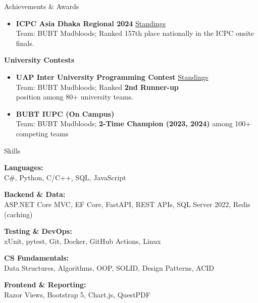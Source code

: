 \documentclass{resume}
\begin{document}
\begin{minipage}[t]{0.46\textwidth}
\begin{rSection}{Achievements \& Awards}
{\begin{itemize}[leftmargin=1.5em, itemsep=2pt, parsep=0pt, topsep=2pt]
    \item \textbf{ICPC Asia Dhaka Regional 2024} \hfill \href{https://bapsoj.org/contests/icpc-asia-dhaka-regional-contest-2024-onsite-round/standings}{Standings} \\
   Team: BUBT Mudbloods; Ranked 157th place nationally in the ICPC onsite finals.
\end{itemize}

\vspace{6pt}
{\bf University Contests}
\begin{itemize}[leftmargin=1.5em, itemsep=2pt, parsep=0pt, topsep=2pt]
    \item \textbf{UAP Inter University Programming Contest} \hfill \href{https://toph.co/c/uap-inter-university-collaborative-1-0-junior/standings}{Standings} \\
    Team: BUBT Mudbloods; Ranked \textbf{2nd Runner-up} \\ 
    position among 80+ university teams.

    \item \textbf{BUBT IUPC (On Campus)} \\
    Team: BUBT Mudbloods; \textbf{2-Time Champion (2023, 2024)} among 100+ competing teams
\end{itemize}
}
\end{rSection}


\begin{rSection}{Skills}

\textbf{Languages:}\\
C\#, Python, C/C++, SQL, JavaScript

\vspace{4pt}
\textbf{Backend \& Data:}\\
ASP.NET Core MVC, EF Core, FastAPI, REST APIs, SQL Server 2022, Redis (caching)

\vspace{4pt}
\textbf{Testing \& DevOps:}\\
xUnit, pytest, Git, Docker, GitHub Actions, Linux

\vspace{4pt}
\textbf{CS Fundamentals:}\\
Data Structures, Algorithms, OOP, SOLID, Design Patterns, ACID

\vspace{4pt}
\textbf{Frontend \& Reporting:}\\
Razor Views, Bootstrap 5, Chart.js, QuestPDF

\end{rSection}



\end{minipage}%
\end{document}
